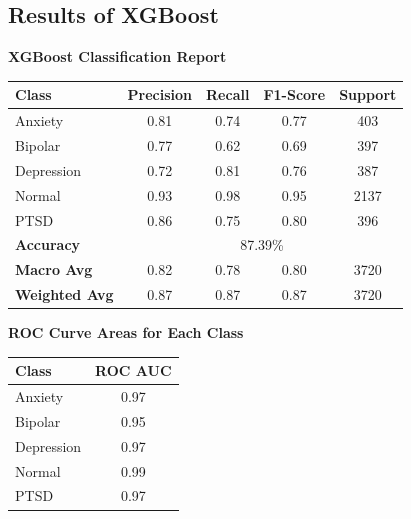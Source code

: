 \pagebreak



\subsection{Results of XGBoost}

\begin{center}
    \textbf{XGBoost Classification Report} \\[0.5em]
    \begin{tabular}{|l|c|c|c|c|}
        \hline
        \textbf{Class} & \textbf{Precision} & \textbf{Recall} & \textbf{F1-Score} & \textbf{Support} \\ \hline
        Anxiety        & 0.81               & 0.74            & 0.77              & 403              \\ \hline
        Bipolar        & 0.77               & 0.62            & 0.69              & 397              \\ \hline
        Depression     & 0.72               & 0.81            & 0.76              & 387              \\ \hline
        Normal         & 0.93               & 0.98            & 0.95              & 2137             \\ \hline
        PTSD           & 0.86               & 0.75            & 0.80              & 396              \\ \hline
        \textbf{Accuracy} & \multicolumn{4}{|c|}{87.39\%} \\ \hline
        \textbf{Macro Avg} & 0.82            & 0.78            & 0.80              & 3720             \\ \hline
        \textbf{Weighted Avg} & 0.87         & 0.87            & 0.87              & 3720             \\ \hline
    \end{tabular}
\end{center}

\vspace{0.25em}

\begin{center}
    \textbf{ROC Curve Areas for Each Class} \\[0.5em]
    \begin{tabular}{|l|c|}
        \hline
        \textbf{Class}  & \textbf{ROC AUC} \\ \hline
        Anxiety         & 0.97            \\ \hline
        Bipolar         & 0.95            \\ \hline
        Depression      & 0.97            \\ \hline
        Normal          & 0.99            \\ \hline
        PTSD            & 0.97            \\ \hline
    \end{tabular}
\end{center}

